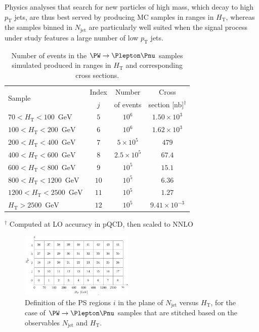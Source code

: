 \documentclass[twocolumn,epjc3]{svjour3}
\newcommand{\pT}{\ensuremath{p_{\textrm{T}}}\xspace}
\newcommand{\HT}{\ensuremath{H_{\mathrm{T}}}\xspace}
\newcommand{\GeV}{\ensuremath{\textrm{GeV}}\xspace}
\newcommand{\jet}{\ensuremath{\textrm{jet}}\xspace}
\begin{document}
Physics analyses that search for new particles of high mass, which decay to high $\pT$ jets, are thus best served by producing MC samples in ranges in $\HT$,
whereas the samples binned in $N_{\jet}$ are particularly well suited when the signal process under study features a large number of low $\pT$ jets.

\begin{table}
\caption{
  Number of events in the $\PW \to \Plepton\Pnu$ samples simulated produced in ranges in $\HT$ and corresponding cross sections.
}
\label{tab:samples_WJets_vs_Njet_and_HT}
\begin{center}
\begin{tabular}{l|c|c|c}
\hline
\multirow{2}{20mm}{Sample} & Index & Number    & Cross                    \\
                           & $j$   & of events & section [nb]$^{\dagger}$ \\
\hline
$  70 < \HT <  100$~\GeV   &  $5$  &            $10^{6}$ & $1.50 \times 10^{3}$ \\
$ 100 < \HT <  200$~\GeV   &  $6$  &            $10^{6}$ & $1.62 \times 10^{3}$ \\
$ 200 < \HT <  400$~\GeV   &  $7$  & $5   \times 10^{5}$ & $479$ \\
$ 400 < \HT <  600$~\GeV   &  $8$  & $2.5 \times 10^{5}$ & $67.4$ \\
$ 600 < \HT <  800$~\GeV   &  $9$  &            $10^{5}$ & $15.1$ \\
$ 800 < \HT < 1200$~\GeV   & $10$  &            $10^{5}$ & $6.36$ \\
$1200 < \HT < 2500$~\GeV   & $11$  &            $10^{5}$ & $1.27$ \\
$       \HT > 2500$~\GeV   & $12$  &            $10^{5}$ & $9.41 \times 10^{-3}$ \\
\hline
\end{tabular}
\end{center}
$^{\dagger}$ Computed at LO accuracy in pQCD, then scaled to NNLO
\end{table}

\begin{figure}
\includegraphics[width=0.48\textwidth]{plots/regions_WJets_vs_Njet_and_HT.pdf}
\caption{
  Definition of the PS regions $i$ in the plane of $N_{\jet}$ versus $\HT$,
  for the case of $\PW \to \Plepton\Pnu$ samples that are stitched based on the observables $N_{\jet}$ and $\HT$.
}
\label{fig:regions_WJets_vs_Njet_and_HT}
\end{figure}
\end{document}
